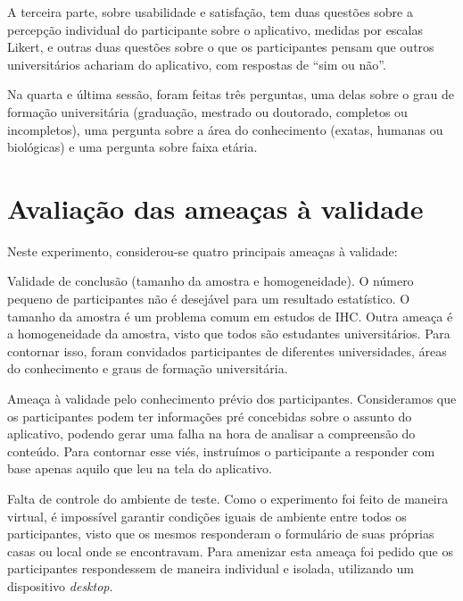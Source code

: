 \documentclass[12pt]{article}
\begin{document}
A terceira parte, sobre usabilidade e satisfação, tem duas questões sobre a percepção individual do participante sobre o aplicativo, medidas por escalas Likert, e outras duas questões sobre o que os participantes pensam que outros universitários achariam do aplicativo, com respostas de ``sim ou não''. 

Na quarta e última sessão, foram feitas três perguntas, uma delas sobre o grau de formação universitária (graduação, mestrado ou doutorado, completos ou incompletos), uma pergunta sobre a área do conhecimento (exatas, humanas ou biológicas) e uma pergunta sobre faixa etária.

\section{Avaliação das ameaças à validade}

Neste experimento, considerou-se quatro principais ameaças à validade: 

Validade de conclusão (tamanho da amostra e homogeneidade). O número pequeno de participantes não é desejável para um resultado estatístico. O tamanho da amostra é um problema comum em estudos de IHC. Outra ameaça é a homogeneidade da amostra, visto que todos são estudantes universitários. Para contornar isso, foram convidados participantes de diferentes universidades, áreas do conhecimento e graus de formação universitária.

Ameaça à validade pelo conhecimento prévio dos participantes. Consideramos que os participantes podem ter informações pré concebidas sobre o assunto do aplicativo, podendo gerar uma falha na hora de analisar a compreensão do conteúdo. Para contornar esse viés, instruímos o participante a responder com base apenas aquilo que leu na tela do aplicativo.

Falta de controle do ambiente de teste. Como o experimento foi feito de maneira virtual, é impossível garantir condições iguais de ambiente entre todos os participantes, visto que os mesmos responderam o formulário de suas próprias casas ou local onde se encontravam. Para amenizar esta ameaça foi pedido que os participantes respondessem de maneira individual e isolada, utilizando um dispositivo \textit{desktop}.



\end{document}
